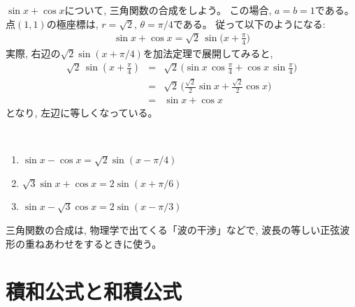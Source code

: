 \begin{exmpl} $\sin x + \cos x$について, 三角関数の合成をしよう。
この場合, $a=b=1$である。点$(1, 1)$の極座標は, $r=\sqrt{2}$, $\theta=\pi/4$である。
従って以下のようになる:
\begin{eqnarray*}
\sin x+\cos x=\sqrt{2}\,\sin \bigl(x+\frac{\pi}{4}\bigr)
\end{eqnarray*}
実際, 右辺の$\sqrt{2}\sin (x+\pi/4)$を加法定理で展開してみると, 
\begin{eqnarray*}
\sqrt{2}\,\sin (x+\frac{\pi}{4}) &=& \sqrt{2}\,\bigl(\sin x \, \cos \frac{\pi}{4} + \cos x \, \sin \frac{\pi}{4}\bigr)\\
&=& \sqrt{2}\,\bigl(\frac{\sqrt{2}}{2} \sin x + \frac{\sqrt{2}}{2} \cos x\bigr)\\
&=& \sin x + \cos x
\end{eqnarray*}
となり, 左辺に等しくなっている。\\
\end{exmpl}

\begin{exmpl}　
\begin{enumerate}
\item $\sin x-\cos x=\sqrt{2}\sin (x-\pi/4)$
\item $\sqrt{3}\sin x+\cos x=2\sin(x+\pi/6)$
\item $\sin x-\sqrt{3}\cos x=2\sin(x-\pi/3)$
\end{enumerate}\end{exmpl}
\mv
三角関数の合成は, 物理学で出てくる「波の干渉」などで, 
波長の等しい正弦波形の重ねあわせをするときに使う。\mv


\section{積和公式と和積公式}

